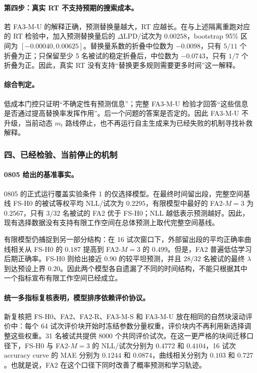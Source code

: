 \paragraph{第四步：真实 RT 不支持预期的搜索成本。}
若 FA3-M-U 的解释正确，预测替换量越大，RT 应越长。在与上述隔离重跑对应的 RT 检验中，加入预测替换量后的 $\Delta\mathrm{LPD}$/试次为 $0.00258$，bootstrap 95\% 区间为 $[-0.00040,0.00625]$。替换量系数的折叠中位数为 $-0.0098$，只有 $5/11$ 个折叠为正；只保留至少 5 名被试的稳定折叠后，中位数为 $-0.0743$，只有 $1/7$ 个折叠为正。因此，真实 RT 没有支持“替换更多规则需要更多时间”这一解释。

\paragraph{综合判定。}
低成本门控只证明“不确定性有预测信息”；完整 FA3-M-U 检验才回答“这些信息是否通过提高替换率发挥作用”。后一个问题的答案是否定的。因此 FA3-M-U 不升级，当前动态 $m_t$ 路线停止，也不再运行自主生成来为已经失败的机制寻找补救解释。


\subsubsection{四、已经检验、当前停止的机制}

\paragraph{0805 给出的基准事实。}
0805 的正式运行覆盖实验条件 1 的仅选择模型。在最终时间留出段，完整空间基线 FS-H0 的被试等权平均 NLL/试次为 $0.2295$，有限模型中最好的 FA2-$M=3$ 为 $0.2567$，只有 $3/32$ 名被试的 FA2 优于 FS-H0；NLL 越低表示预测越好。因此，现有选择数据没有支持有限工作空间在总体预测上取代完整空间基线。

有限模型仍捕捉到另一部分结构：在 16 试次窗口下，外部留出段的平均正确率曲线相关从 FS-H0 的 $0.187$ 提高到 FA2-$M=3$ 的 $0.499$。但是，FA2 普遍低估学习后期正确率。FS-H0 则给出接近 $0.90$ 的较平坦预测，并且 $28/32$ 名被试的最终 $\lambda$ 到达预设上界 $0.20$。因此两个模型各自遗漏了不同的时间结构，不能只根据其中一个指标宣布有限工作空间已经成立。

\paragraph{统一多指标复核表明，模型排序依赖评价协议。}
新复核把 FS-H0、FA2、FA2-R、FA3-M-S 和 FA3-M-U 放在相同的自然块滚动评价中：每个 64 试次评价块开始时冻结参数分量权重，评价块内不再利用新选择调整这些权重。31 名被试共提供 8000 个共同评价试次。在这一更严格的块间迁移口径下，FS-H0 与 FA2-$M=3$ 的 NLL/试次分别为 $0.4772$ 和 $0.4104$，16 试次 accuracy curve 的 MAE 分别为 $0.1244$ 和 $0.0874$，曲线相关分别为 $0.103$ 和 $0.727$。也就是说，FA2 在这个口径下同时改善了概率预测和学习轨迹。

